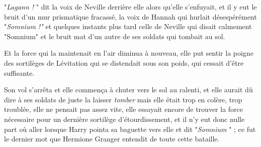 "\emph{Lagann !} " dit la voix de Neville derrière elle alors qu'elle s'enfuyait, et il y eut le bruit d'un mur prismatique fracassé, la voix de Hannah qui hurlait désespérément "\emph{Somnium !" } et quelques instants plus tard celle de Neville qui disait calmement "Somnium" et le bruit mat d'un autre de ses soldats qui tombait au sol.

Et la force qui la maintenait en l'air diminua à nouveau, elle put sentir la poigne des sortilèges de Lévitation qui se distendait sous son poids, qui cessait d'être suffisante.

Son vol s'arrêta et elle commença à chuter vers le sol au ralenti, et elle aurait dû dire à ses soldats de juste la laisser \emph{tomber}  mais elle était trop en colère, trop troublée, elle ne pensait pas assez vite, elle essayait encore de trouver la force nécessaire pour un dernière sortilège d'étourdissement, et il n'y eut donc nulle part où aller lorsque Harry pointa sa baguette vers elle et dit "\emph{Somnium} " ; ce fut le dernier mot que Hermione Granger entendit de toute cette bataille.

